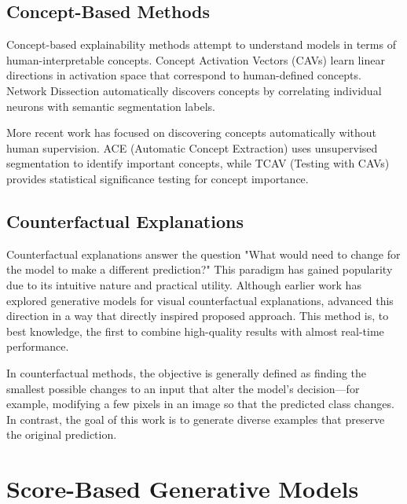 \subsection{Concept-Based Methods}

Concept-based explainability methods attempt to understand models in terms of human-interpretable concepts. Concept Activation Vectors (CAVs) \citep{kim2018interpretabilityfeatureattributionquantitative} learn linear directions in activation space that correspond to human-defined concepts. Network Dissection \citep{bau2017networkdissectionquantifyinginterpretability} automatically discovers concepts by correlating individual neurons with semantic segmentation labels.

More recent work has focused on discovering concepts automatically without human supervision. ACE (Automatic Concept Extraction) \citep{ghorbani2019automaticconceptbasedexplanations} uses unsupervised segmentation to identify important concepts, while TCAV (Testing with CAVs) \citep{kim2018interpretabilityfeatureattributionquantitative} provides statistical significance testing for concept importance.

\subsection{Counterfactual Explanations}

Counterfactual explanations answer the question "What would need to change for the model to make a different prediction?" This paradigm has gained popularity due to its intuitive nature and practical utility. Although earlier work has explored generative models for visual counterfactual explanations, \citep{sobieski2024rethinkingvisualcounterfactualexplanations} advanced this direction in a way that directly inspired proposed approach. This method is, to best knowledge, the first to combine high-quality results with almost real-time performance.

In counterfactual methods, the objective is generally defined as finding the smallest possible changes to an input that alter the model’s decision—for example, modifying a few pixels in an image so that the predicted class changes. In contrast, the goal of this work is to generate diverse examples that preserve the original prediction.

\section{Score-Based Generative Models}\label{sec:sgm_background}


